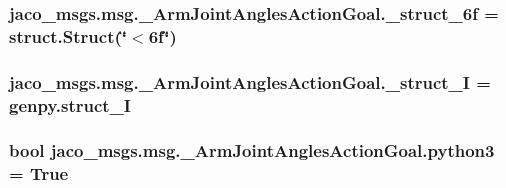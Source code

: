 \subsubsection[{\texorpdfstring{\+\_\+struct\+\_\+6f}{_struct_6f}}]{\setlength{\rightskip}{0pt plus 5cm}jaco\+\_\+msgs.\+msg.\+\_\+\+Arm\+Joint\+Angles\+Action\+Goal.\+\_\+struct\+\_\+6f = struct.\+Struct(\char`\"{}$<$6f\char`\"{})\hspace{0.3cm}{\ttfamily [private]}}\hypertarget{namespacejaco__msgs_1_1msg_1_1__ArmJointAnglesActionGoal_a4a82e6131f90bdfba18b2c53dba0bb6e}{}\label{namespacejaco__msgs_1_1msg_1_1__ArmJointAnglesActionGoal_a4a82e6131f90bdfba18b2c53dba0bb6e}
\subsubsection[{\texorpdfstring{\+\_\+struct\+\_\+I}{_struct_I}}]{\setlength{\rightskip}{0pt plus 5cm}jaco\+\_\+msgs.\+msg.\+\_\+\+Arm\+Joint\+Angles\+Action\+Goal.\+\_\+struct\+\_\+I = genpy.\+struct\+\_\+I\hspace{0.3cm}{\ttfamily [private]}}\hypertarget{namespacejaco__msgs_1_1msg_1_1__ArmJointAnglesActionGoal_a46eef47e77492d59cbce2bc42fcccf94}{}\label{namespacejaco__msgs_1_1msg_1_1__ArmJointAnglesActionGoal_a46eef47e77492d59cbce2bc42fcccf94}
\subsubsection[{\texorpdfstring{python3}{python3}}]{\setlength{\rightskip}{0pt plus 5cm}bool jaco\+\_\+msgs.\+msg.\+\_\+\+Arm\+Joint\+Angles\+Action\+Goal.\+python3 = True}\hypertarget{namespacejaco__msgs_1_1msg_1_1__ArmJointAnglesActionGoal_aa21345bd6c78db7b5211f476abc8f7bd}{}\label{namespacejaco__msgs_1_1msg_1_1__ArmJointAnglesActionGoal_aa21345bd6c78db7b5211f476abc8f7bd}
